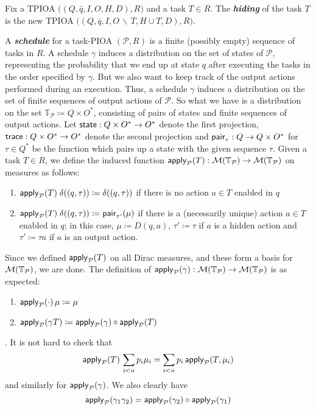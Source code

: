 \documentclass[10pt]{article}
\begin{document}
\begin{definition}
Fix a TPIOA $\big((Q,\bar{q},I,O,H,D),R\big)$ and a task $T \in R$. The \textbf{\emph{hiding}} of the task $T$ is the new TPIOA $\big((Q,\bar{q},I,O \, \backslash \, T, H \cup T, D),R\big)$.
\end{definition}



A \emph{\textbf{schedule}} for a task-PIOA $(\mathcal{P},R)$ is a finite (possibly empty) sequence of tasks in $R$. A schedule $\gamma$ induces a distribution on the set of states of $\mathcal{P}$, representing the probability that we end up at state $q$ after executing the tasks in the order specified by $\gamma$. But we also want to keep track of the output actions performed during an execution. Thus, a schedule $\gamma$ induces a distribution on the set of finite sequences of output actions of $\mathcal{P}$. So what we have is a distribution on the set $\mathbb{T}_\mathcal{\mathcal{P}} \coloneqq Q \times O^*$, consisting of pairs of states and finite sequences of output actions. Let $\mathsf{state} : Q \times O^* \to O^*$ denote the first projection, $\mathsf{trace} : Q \times O^* \to O^*$ denote the second projection and $\mathsf{pair}_\tau : Q \to Q \times O^*$ for $\tau \in Q^*$ be the function which pairs up a state with the given sequence $\tau$. Given a task $T \in R$, we define the induced function $\mathsf{apply}_\mathcal{P}(T) : \mathcal{M}(\mathbb{T}_\mathcal{P}) \to \mathcal{M}(\mathbb{T}_\mathcal{P})$ on measures as follows:
\begin{enumerate}
\item $\mathsf{apply}_\mathcal{P}(T) \; \delta((q,\tau)) \coloneqq \delta((q,\tau))$ if there is no action $a \in T$ enabled in $q$
\item $\mathsf{apply}_\mathcal{P}(T) \; \delta((q,\tau)) \coloneqq \mathsf{pair}_{\tau'}(\mu)$ if there is a (necessarily unique) action $a \in T$ enabled in $q$; in this case, $\mu \coloneqq D(q,a)$, $\tau' \coloneqq \tau$ if $a$ is a hidden action and $\tau' \coloneqq \tau a$ if $a$ is an output action.
\end{enumerate}
Since we defined $\mathsf{apply}_\mathcal{P}(T)$ on all Dirac measures, and these form a basis for $\mathcal{M}(\mathbb{T}_\mathcal{P})$, we are done. The definition of $\mathsf{apply}_\mathcal{P}(\gamma) : \mathcal{M}(\mathbb{T}_\mathcal{P}) \to \mathcal{M}(\mathbb{T}_\mathcal{P})$ is as expected:
\begin{enumerate}
\item $\mathsf{apply}_\mathcal{P}(\cdot) \, \mu \coloneqq \mu$
\item $\mathsf{apply}_\mathcal{P}(\gamma T) \coloneqq \mathsf{apply}_\mathcal{P}(\gamma) \circ \mathsf{apply}_\mathcal{P}(T)$
\end{enumerate}.
 It is not hard to check that 
\[ \mathsf{apply}_\mathcal{P}(T) \, \sum\limits_{i < n} p_i \mu_i  = \sum\limits_{i < n} p_i \, \mathsf{apply}_\mathcal{P}(T,\mu_i)\]
 and similarly for $\mathsf{apply}_\mathcal{P}(\gamma)$. We also clearly have
 \[\mathsf{apply}_\mathcal{P}(\gamma_1 \gamma_2) = \mathsf{apply}_\mathcal{P}(\gamma_2) \circ \mathsf{apply}_\mathcal{P}(\gamma_1) \]
\end{document}
